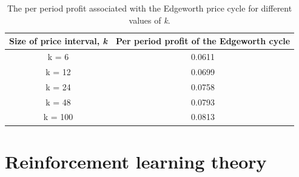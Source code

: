 \documentclass{article}
\begin{document}
\begin{table}[H]
    \centering
    \begin{tabular}{|c|c|}
        \hline
        Size of price interval, \textit{k} & Per period profit of the Edgeworth cycle \\
        \hline
        k = 6 & 0.0611 \\
        \hline
        k = 12 & 0.0699 \\
        \hline 
        k = 24 & 0.0758 \\
        \hline
        k = 48 & 0.0793 \\
        \hline
        k = 100 & 0.0813 \\
        \hline
    \end{tabular}
    \caption{The per period profit associated with the Edgeworth price cycle for different values of \textit{k}.}
    \label{tab:kPrPeriodProf}
\end{table}




\section{Reinforcement learning theory} \label{ReinforcementLearningTheory}
\end{document}
